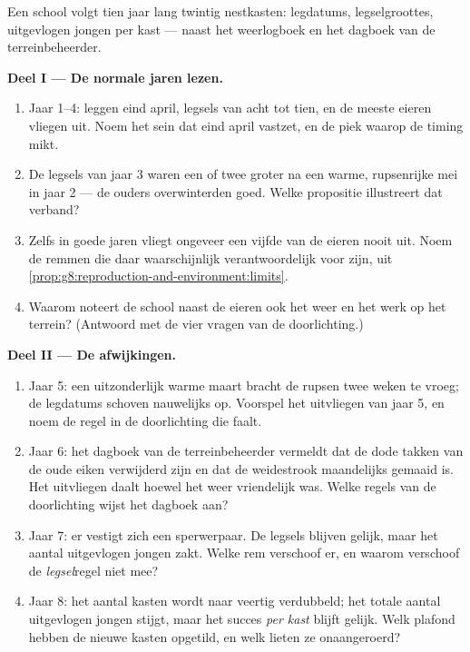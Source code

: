 \begin{problem}\label{pb:g8:reproduction-and-environment:1}
Een school volgt tien jaar lang twintig nestkasten: legdatums,
legselgroottes, uitgevlogen jongen per kast --- naast het weerlogboek en
het dagboek van de terreinbeheerder.

\medskip\noindent\textbf{Deel I --- De normale jaren
lezen.}
\begin{enumerate}
  \item Jaar 1--4: leggen eind april, legsels van acht tot tien, en de
        meeste eieren vliegen uit. Noem het sein dat eind april vastzet,
        en de piek waarop de timing mikt.
  \item De legsels van jaar 3 waren een  of twee groter na een warme,
        rupsenrijke mei in jaar 2 --- de ouders overwinterden goed. Welke
        propositie illustreert dat verband?
  \item Zelfs in goede jaren vliegt ongeveer een vijfde van de eieren
        nooit uit. Noem de remmen die daar waarschijnlijk verantwoordelijk
        voor zijn, uit
        \cref{prop:g8:reproduction-and-environment:limits}.
  \item Waarom noteert de school naast de eieren ook het weer en het werk
        op het terrein? (Antwoord met de vier vragen van de doorlichting.)
\end{enumerate}

\medskip\noindent\textbf{Deel II --- De afwijkingen.}
\begin{enumerate}[resume]
  \item Jaar 5: een uitzonderlijk warme maart bracht de rupsen twee weken
        te vroeg; de legdatums schoven nauwelijks op. Voorspel het
        uitvliegen van jaar 5, en noem de regel in de doorlichting die
        faalt.
  \item Jaar 6: het dagboek van de terreinbeheerder vermeldt dat de dode
        takken van de oude eiken verwijderd zijn en dat de weidestrook
        maandelijks gemaaid is. Het uitvliegen daalt hoewel het weer
        vriendelijk was. Welke regels van de doorlichting wijst het
        dagboek aan?
  \item Jaar 7: er vestigt zich een sperwerpaar. De legsels blijven
        gelijk, maar het aantal uitgevlogen jongen zakt. Welke rem
        verschoof er, en waarom verschoof de \emph{legsel}regel niet mee?
  \item Jaar 8: het aantal kasten wordt naar veertig verdubbeld; het
        totale aantal uitgevlogen jongen stijgt, maar het succes
        \emph{per kast} blijft gelijk. Welk plafond hebben de nieuwe
        kasten opgetild, en welk lieten ze onaangeroerd?
\end{enumerate}


\end{problem}
